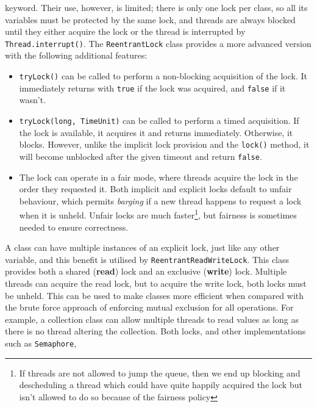 \begin{itemize}
    keyword.  Their use, however, is limited; there is only one lock
    per class, so all its variables must be protected by the same
    lock, and threads are always blocked until they either acquire the
    lock or the thread is interrupted by \texttt{Thread.interrupt()}.
    The \texttt{ReentrantLock} class provides a more advanced version
    with the following additional features:
    \begin{itemize}
      \item \texttt{tryLock()} can be called to perform a non-blocking
        acquisition of the lock.  It immediately returns with
        \texttt{true} if the lock was acquired, and \texttt{false} if
        it wasn't.
      \item \texttt{tryLock(long, TimeUnit)} can be called to perform
        a timed acquisition.  If the lock is available, it acquires it
        and returns immediately.  Otherwise, it blocks.  However,
        unlike the implicit lock provision and the \texttt{lock()}
        method, it will become unblocked after the given timeout and
        return \texttt{false}.
        \item The lock can operate in a fair mode, where threads
          acquire the lock in the order they requested it.  Both
          implicit and explicit locks default to unfair behaviour,
          which permits \emph{barging} if a new thread happens to
          request a lock when it is unheld.  Unfair locks are much
          faster\footnote{If threads are not allowed to jump the
            queue, then we end up blocking and descheduling a thread
            which could have quite happily acquired the lock but isn't
            allowed to do so because of the fairness policy}, but
          fairness is sometimes needed to ensure correctness.
    \end{itemize}
    A class can have multiple instances of an explicit lock, just like
    any other variable, and this benefit is utilised by
    \texttt{ReentrantReadWriteLock}.  This class provides both a
    shared (\textbf{read}) lock and an exclusive (\textbf{write})
    lock.  Multiple threads can acquire the read lock, but to acquire
    the write lock, both locks must be unheld.  This can be used to
    make classes more efficient when compared with the brute force
    approach of enforcing mutual exclusion for all operations.  For
    example, a collection class can allow multiple threads to read
    values as long as there is no thread altering the collection.
    Both locks, and other implementations such as \texttt{Semaphore},

\end{itemize}
